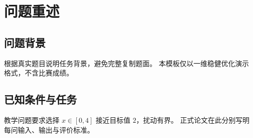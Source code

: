 \section{问题重述}\label{sec:restatement}
\subsection{问题背景}
根据真实题目说明任务背景，避免完整复制题面。
本模板仅以一维稳健优化演示格式，不含比赛成绩。
\subsection{已知条件与任务}
教学问题要求选择 $x\in[0,4]$ 接近目标值 $2$，扰动有界。
正式论文在此分别写明每问输入、输出与评价标准。
